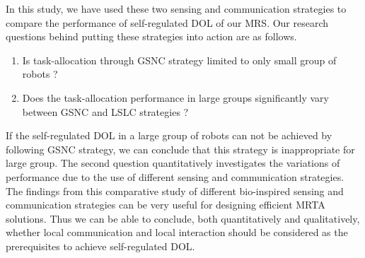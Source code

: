 In this study, we have used these two sensing and communication strategies to compare the performance of self-regulated DOL of our MRS. %
Our research questions behind putting these strategies into action are as follows.
\begin{enumerate}
\item Is  task-allocation through GSNC strategy limited to only small group of robots ?
\item 
Does the task-allocation performance  in large groups  significantly vary between GSNC and LSLC strategies ?
\end{enumerate}
If the self-regulated DOL in a large group of robots can not be achieved by following GSNC strategy, we can  conclude that this strategy is inappropriate for large group. The second question quantitatively investigates the variations of performance due to the use of different sensing and communication strategies.
The findings from this  comparative study of different bio-inspired  sensing and communication strategies can be very useful  for designing efficient MRTA solutions. Thus we can be able to conclude, both quantitatively and qualitatively, whether local communication and local interaction should be considered as the prerequisites to achieve self-regulated DOL.
